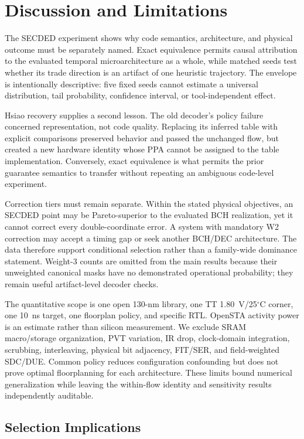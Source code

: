 \section{Discussion and Limitations}

The SECDED experiment shows why code semantics, architecture, and physical outcome must be separately named. Exact equivalence permits causal attribution to the evaluated temporal microarchitecture as a whole, while matched seeds test whether its trade direction is an artifact of one heuristic trajectory. The envelope is intentionally descriptive: five fixed seeds cannot estimate a universal distribution, tail probability, confidence interval, or tool-independent effect.

Hsiao recovery supplies a second lesson. The old decoder's policy failure concerned representation, not code quality. Replacing its inferred table with explicit comparisons preserved behavior and passed the unchanged flow, but created a new hardware identity whose PPA cannot be assigned to the table implementation. Conversely, exact equivalence is what permits the prior guarantee semantics to transfer without repeating an ambiguous code-level experiment.

Correction tiers must remain separate. Within the stated physical objectives, an SECDED point may be Pareto-superior to the evaluated BCH realization, yet it cannot correct every double-coordinate error. A system with mandatory W2 correction may accept a timing gap or seek another BCH/DEC architecture. The data therefore support conditional selection rather than a family-wide dominance statement. Weight-3 counts are omitted from the main results because their unweighted canonical masks have no demonstrated operational probability; they remain useful artifact-level decoder checks.

The quantitative scope is one open 130-nm library, one TT 1.80~V/25$^{\circ}$C corner, one 10~ns target, one floorplan policy, and specific RTL. OpenSTA activity power is an estimate rather than silicon measurement. We exclude SRAM macro/storage organization, PVT variation, IR drop, clock-domain integration, scrubbing, interleaving, physical bit adjacency, FIT/SER, and field-weighted SDC/DUE. Common policy reduces configuration confounding but does not prove optimal floorplanning for each architecture. These limits bound numerical generalization while leaving the within-flow identity and sensitivity results independently auditable.

\subsection{Selection Implications}

